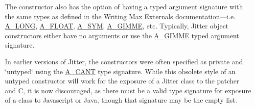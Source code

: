 The constructor also has the option of having a typed argument signature with the same types as defined in the Writing Max Externals documentation—i.e. \hyperlink{group__atom_gga8aa6700e9f00b132eb376db6e39ade47a002f28879581a6f66ea492b994b96f1e}{A\_\-LONG}, \hyperlink{group__atom_gga8aa6700e9f00b132eb376db6e39ade47a0b3aa0ab8104573dfc9cb70b5b08031f}{A\_\-FLOAT}, \hyperlink{group__atom_gga8aa6700e9f00b132eb376db6e39ade47a2d661c2a5d949566e2f1944c99bceeea}{A\_\-SYM}, \hyperlink{group__atom_gga8aa6700e9f00b132eb376db6e39ade47a81c1a8550f038db16a619167a70a79b6}{A\_\-GIMME}, etc. Typically, Jitter object constructors either have no arguments or use the \hyperlink{group__atom_gga8aa6700e9f00b132eb376db6e39ade47a81c1a8550f038db16a619167a70a79b6}{A\_\-GIMME} typed argument signature.

In earlier versions of Jitter, the constructors were often specified as private and \char`\"{}untyped\char`\"{} using the \hyperlink{group__atom_gga8aa6700e9f00b132eb376db6e39ade47af48193ec36e53b1507d81c49873c8d7a}{A\_\-CANT} type signature. While this obsolete style of an untyped constructor will work for the exposure of a Jitter class to the patcher and C, it is now discouraged, as there must be a valid type signature for exposure of a class to Javascript or Java, though that signature may be the empty list.

